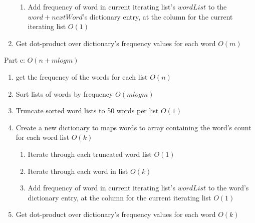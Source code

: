 \documentclass[12pt,twoside]{article}
\begin{document}
\begin{problems}
\begin{problemparts}
\begin{enumerate}
\begin{enumerate}
  \item Add frequency of word in current iterating list's $wordList$ to the $word + nextWord$'s dictionary entry, at the column for the current iterating list $O(1)$
  \end{enumerate}
  \item Get dot-product over dictionary's frequency values for each word $O(m)$
\end{enumerate}

Part c: $O(n + mlogm)$

\begin{enumerate}
\item get the frequency of the words for each list $O(n)$

\item Sort lists of words by frequency $O(mlogm)$

\item Truncate sorted word lists to 50 words per list $O(1)$

\item Create a new dictionary to maps words to array containing the word's count for each word list $O(k)$
  \begin{enumerate}
  \item Iterate through each truncated word list $O(1)$

  \item Iterate through each word in list $O(k)$

  \item Add frequency of word in current iterating list's $wordList$ to the word's dictionary entry, at the column for the current iterating list $O(1)$
  \end{enumerate}
\item Get dot-product over dictionary's frequency values for each word $O(k)$
\end{enumerate}

\problempart
\end{problemparts}
\end{problems}
\end{document}
